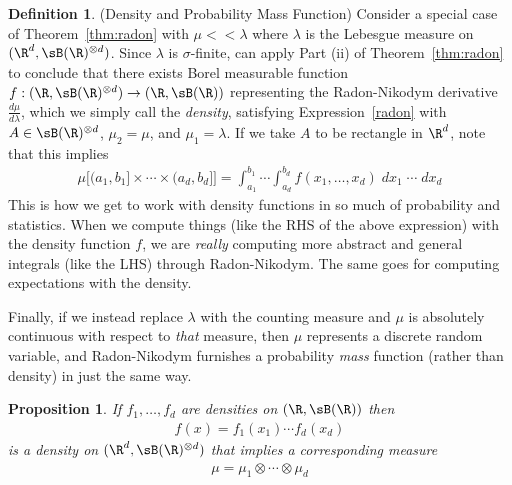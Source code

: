 \documentclass[12pt]{article}
\theoremstyle{plain}
\newtheorem{prop}[thm]{Proposition}
\theoremstyle{definition}
\newtheorem{defn}[thm]{Definition}
\theoremstyle{remark}
\newcommand{\ra}{\rightarrow}
\begin{document}
\begin{defn}
\label{defn:density}
(Density and Probability Mass Function)
Consider a special case of Theorem~\ref{thm:radon} with $\mu<<\lambda$
where $\lambda$ is the Lebesgue measure on $(\R^d,\sB(\R)^{\otimes d})$.
Since $\lambda$ is $\sigma$-finite, can apply Part (ii) of
Theorem~\ref{thm:radon} to conclude that there exists Borel
measurable function $f:(\R,\sB(\R)^{\otimes d})\ra(\R,\sB(\R))$
representing the Radon-Nikodym derivative $\frac{d\mu}{d\lambda}$, which
we simply call the \emph{density}, satisfying Expression~\ref{radon}
with $A\in \sB(\R)^{\otimes d}$, $\mu_2=\mu$, and $\mu_1=\lambda$.  If
we take $A$ to be rectangle in $\R^d$, note that this implies
\begin{align*}
  \mu\big[
    (a_1,b_1] \times\cdots\times (a_d,b_d]
  \big]
  =
  \int_{a_1}^{b_1}
  \cdots
  \int_{a_d}^{b_d}
  f(x_1,\ldots,x_d)\;
  dx_1\;\cdots \;dx_d
\end{align*}
This is how we get to work with density functions in so much of
probability and statistics. When we compute things (like the RHS of the
above expression) with the density function $f$, we are \emph{really}
computing more abstract and general integrals (like the LHS) through
Radon-Nikodym. The same goes for computing expectations with the
density.

Finally, if we instead replace $\lambda$ with the counting measure and
$\mu$ is absolutely continuous with respect to \emph{that} measure, then
$\mu$ represents a discrete random variable, and Radon-Nikodym furnishes
a probability \emph{mass} function (rather than density) in just the
same way.
\end{defn}

\begin{prop}
\label{prop:densityproduct}
If $f_1,\ldots,f_d$ are densities on $(\R,\sB(\R))$ then
\begin{align*}
  f(x) = f_1(x_1) \cdots f_d(x_d)
\end{align*}
is a density on $(\R^d,\sB(\R)^{\otimes d})$ that implies a
corresponding measure
\begin{align*}
  \mu = \mu_1\otimes \cdots \otimes \mu_d
\end{align*}
\end{prop}
\end{document}
